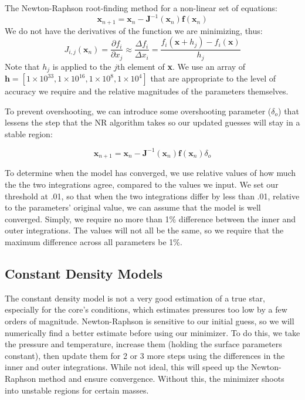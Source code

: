 \documentclass[twocolumn]{aastex631}
\begin{document}
The Newton-Raphson root-finding method for a non-linear set of equations:
\begin{equation}
	\textbf{x}_{n+1} = \textbf{x}_n - \textbf{J}^{-1}(\textbf{x}_n)\textbf{f}\left(\textbf{x}_n\right)
\end{equation}
We do not have the derivatives of the function we are minimizing, thus:
\begin{equation}
	J_{i,j}(\textbf{x}_n) = \frac{\partial f_i}{\partial x_j} \approx \frac{\Delta f_i}{\Delta x_i} = \frac{f_i(\textbf{x} + h_j) - f_i(\textbf{x})}{h_j}
\end{equation}
Note that $h_j$ is applied to the $j$th element of \textbf{x}. We use an array of $\textbf{h} = [1\times 10^{33}, 1\times10^{16}, 1\times 10^8, 1\times 10^4]$ that are appropriate to the level of accuracy we require and the relative magnitudes of the parameters themselves. 

To prevent overshooting, we can introduce some overshooting parameter ($\delta_o$) that lessens the step that the NR algorithm takes so our updated guesses will stay in a stable region:

\begin{equation}
	\textbf{x}_{n+1} = \textbf{x}_n - \textbf{J}^{-1}(\textbf{x}_n)\textbf{f}\left(\textbf{x}_n\right)\delta_o
\end{equation}

To determine when the model has converged, we use relative values of how much the the two integrations agree, compared to the values we input. We set our threshold at .01, so that when the two integrations differ by less than .01, relative to the parameters' original value, we can assume that the model is well converged. Simply, we require no more than 1\% difference between the inner and outer integrations. The values will not all be the same, so we require that the maximum difference across all parameters be 1\%.


\subsection{Constant Density Models}

The constant density model is not a very good estimation of a true star, especially for the core's conditions, which estimates pressures too low by a few orders of magnitude. Newton-Raphson is sensitive to our initial guess, so we will numerically find a better estimate before using our minimizer. To do this, we take the pressure and temperature, increase them (holding the surface parameters constant), then update them for 2 or 3 more steps using the differences in the inner and outer integrations. While not ideal, this will speed up the Newton-Raphson method and ensure convergence. Without this, the minimizer shoots into unstable regions for certain masses.
\end{document}
